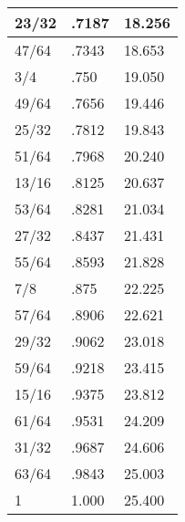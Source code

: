 \documentclass[12pt, letterpaper, oneside]{article}
\begin{document}
\begin{multicols}{2}
\begin{center}
\begin{tabular}{|l|l|l|}
\rowcolor[rgb]{0.85,0.85,0.85} 23/32 & .7187 & 18.256 \tabularnewline \hline

47/64 & .7343 & 18.653 \tabularnewline \hline

\rowcolor[rgb]{0.85,0.85,0.85} 3/4 & .750 & 19.050 \tabularnewline \hline

49/64 & .7656 & 19.446 \tabularnewline \hline

\rowcolor[rgb]{0.85,0.85,0.85} 25/32 & .7812 & 19.843 \tabularnewline \hline

51/64 & .7968 & 20.240 \tabularnewline \hline

\rowcolor[rgb]{0.85,0.85,0.85} 13/16 & .8125 & 20.637 \tabularnewline \hline

53/64 & .8281 & 21.034 \tabularnewline \hline

\rowcolor[rgb]{0.85,0.85,0.85} 27/32 & .8437 & 21.431 \tabularnewline \hline

55/64 & .8593 & 21.828 \tabularnewline \hline

\rowcolor[rgb]{0.85,0.85,0.85} 7/8 & .875 & 22.225 \tabularnewline \hline

57/64 & .8906 & 22.621 \tabularnewline \hline

\rowcolor[rgb]{0.85,0.85,0.85} 29/32 & .9062 & 23.018 \tabularnewline \hline

59/64 & .9218 & 23.415 \tabularnewline \hline

\rowcolor[rgb]{0.85,0.85,0.85} 15/16 & .9375 & 23.812 \tabularnewline \hline

61/64 & .9531 & 24.209 \tabularnewline \hline

\rowcolor[rgb]{0.85,0.85,0.85} 31/32 & .9687 & 24.606 \tabularnewline \hline

63/64 & .9843 & 25.003 \tabularnewline \hline

\rowcolor[rgb]{0.85,0.85,0.85} 1 & 1.000 & 25.400 \tabularnewline \hline

\end{tabular}
\end{center}

\end{multicols}
\end{document}
